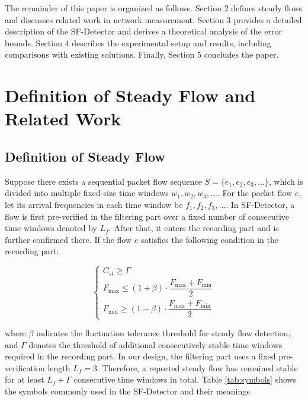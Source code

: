 \documentclass[preprint,12pt]{elsarticle}
\begin{document}
The remainder of this paper is organized as follows. Section 2 defines steady flows and discusses related work in network measurement. Section 3 provides a detailed description of the SF-Detector and derives a theoretical analysis of the error bounds. Section 4 describes the experimental setup and results, including comparisons with existing solutions. Finally, Section 5 concludes the paper.

\section{Definition of Steady Flow and Related Work}

\subsection{Definition of Steady Flow}
Suppose there exists a sequential packet flow sequence $S=\{e_{1},e_{2},e_{3},...\}$, which is divided into multiple fixed-size time windows $w_1, w_2, w_3, ...$. For the packet flow $e$, let its arrival frequencies in each time window be $f_{1},f_{2},f_{3},...$. In SF-Detector, a flow is first pre-verified in the filtering part over a fixed number of consecutive time windows denoted by $L_f$. After that, it enters the recording part and is further confirmed there. If the flow $e$ satisfies the following condition in the recording part:

\begin{equation}
    \begin{cases}
    C_{st} \ge \Gamma \\[6pt]
    F_{\max} \le (1+\beta) \cdot \dfrac{F_{\max} + F_{\min}}{2} \\[8pt]
    F_{\min} \ge (1-\beta) \cdot \dfrac{F_{\max} + F_{\min}}{2}
    \end{cases}
    \label{eq:stability}
\end{equation}

where $\beta$ indicates the fluctuation tolerance threshold for steady flow detection, and $\Gamma$ denotes the threshold of additional consecutively stable time windows required in the recording part. In our design, the filtering part uses a fixed pre-verification length $L_f = 3$. Therefore, a reported steady flow has remained stable for at least $L_f + \Gamma$ consecutive time windows in total. Table \ref{tab:symbols} shows the symbols commonly used in the SF-Detector and their meanings.
\end{document}

